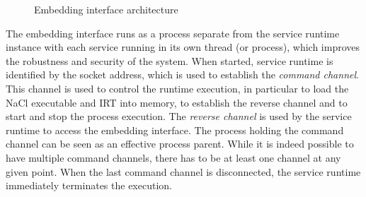 


\begin{figure}
\centering
\caption{Embedding interface architecture}
\label{fig:architecture}
\end{figure}

The embedding interface runs as a process separate from the service
runtime instance with each service running in its own thread (or
process), which improves the robustness and security of the system. When
started, service runtime is identified by the socket address, which is
used to establish the \emph{command channel}. This channel is used to
control the runtime execution, in particular to load the NaCl executable
and IRT into memory, to establish the reverse channel and to start and
stop the process execution.  The \emph{reverse channel} is used by the
service runtime to access the embedding interface. The process holding
the command channel can be seen as an effective process parent. While it
is indeed possible to have multiple command channels, there has to be at
least one channel at any given point.  When the last command channel is
disconnected, the service runtime immediately terminates the execution.


